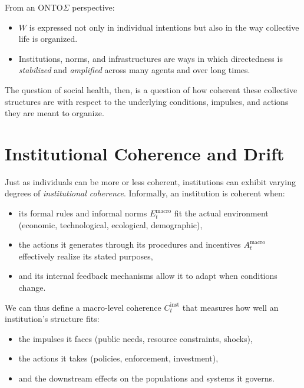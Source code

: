 \documentclass[12pt,a4paper]{report}
\newcommand{\Will}{W}
\begin{document}
From an ONTO$\Sigma$ perspective:

\begin{itemize}[leftmargin=2em]
    \item \(\Will\) is expressed not only in individual intentions but also in the way collective life is organized.
    \item Institutions, norms, and infrastructures are ways in which directedness is \emph{stabilized} and \emph{amplified} across many agents and over long times.
\end{itemize}

The question of social health, then, is a question of how coherent these collective structures are with respect to the underlying conditions, impulses, and actions they are meant to organize.

\section{Institutional Coherence and Drift}

Just as individuals can be more or less coherent, institutions can exhibit varying degrees of \emph{institutional coherence}. Informally, an institution is coherent when:

\begin{itemize}[leftmargin=2em]
    \item its formal rules and informal norms \(E_t^{\mathrm{macro}}\) fit the actual environment (economic, technological, ecological, demographic),
    \item the actions it generates through its procedures and incentives \(A_t^{\mathrm{macro}}\) effectively realize its stated purposes,
    \item and its internal feedback mechanisms allow it to adapt when conditions change.
\end{itemize}

We can thus define a macro-level coherence \(C_t^{\mathrm{inst}}\) that measures how well an institution's structure fits:

\begin{itemize}[leftmargin=2em]
    \item the impulses it faces (public needs, resource constraints, shocks),
    \item the actions it takes (policies, enforcement, investment),
    \item and the downstream effects on the populations and systems it governs.
\end{itemize}
\end{document}
